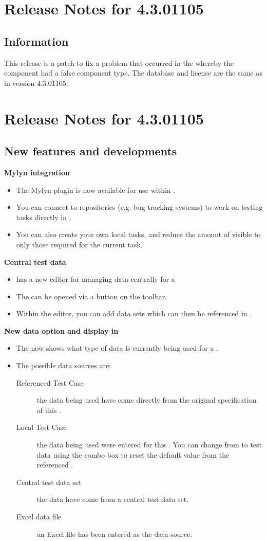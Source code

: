 \documentclass[en,a4paper,twoside,manual,guidancer]{bxreport}
\begin{document}
\section{Release Notes for \gd{} 4.3.01105}
\makeatother
\subsection{Information}
This release is a patch to fix a problem that occurred in the  whereby the  component had a false component type. The database and license are the same as in version 4.3.01105. 

\makeatletter
\section{Release Notes for \gd{} 4.3.01105}
\makeatother
\subsection{New features and developments}
\textbf{Mylyn integration}
\begin{itemize}
\item The Mylyn plugin is now available for use within \gd{}. 
\item You can connect to repositories (e.g. bug-tracking systems) to work on testing tasks directly in \gd{}.
\item You can also create your own local tasks, and reduce the amount of \gdcases{} visible to only those required for the current task.
\end{itemize}
\textbf{Central test data}
\begin{itemize}
\item \gd{} has a new editor for managing data centrally for a \gdproject{}
\item The \gddataeditor{} can be opened via a button on the toolbar.
\item Within the editor, you can add data sets which can then be referenced in \gdcases{}. 
\end{itemize}

\textbf{New data option and display in \gdpropview{}}
\begin{itemize}
\item The \gdpropview{} now shows what type of data is currently being used for a \gdcase{}.
\item The possible data sources are:
\begin{description}
\item [Referenced Test Case]{the data being used have come directly from the original specification of this \gdcase{}. }
\item [Local Test Case]{the data being used were entered for this \gdcase{}. You can change from  to  test data using the combo box to reset the default value from the referenced \gdcase{}.}
\item [Central test data set]{the data have come from a central test data set.}
\item [Excel data file]{an Excel file has been entered as the data source.}
\end{description}
\end{itemize}
\end{document}
